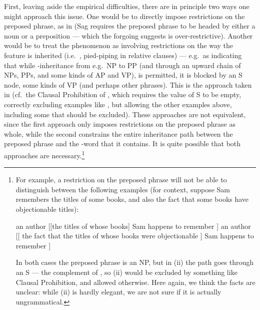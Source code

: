 \documentclass[output=paper
 	        ,biblatex
                ,babelshorthands
                ,newtxmath
                ,draftmode
                ,colorlinks, citecolor=brown
]{langscibook}
\begin{document}
First, leaving aside the empirical difficulties, there are in principle two ways one might
approach this issue. One would be to directly impose restrictions on the preposed phrase,
as in  (Sag requires the preposed phrase to be headed by either a noun
or a preposition --- which the forgoing suggests is over-restrictive). Another would be to
treat the phenomenon as involving restrictions on the way the  feature is
inherited (i.e.\ , pied-piping in relative clauses) --- e.g.\ as
indicating that while -inheritance from e.g.\ NP to PP (and through an upward
chain of NPs, PPs, and some kinds of AP and VP), is permitted, it is blocked by an S node,
some kinds of VP (and perhaps other phrases).  This is the approach taken in  (cf.\
the Clausal  Prohibition of \citealt[220]{Pollard:Sag:94}, which requires the
\feat{rel} value of S to be empty, correctly excluding examples like \pref{x:rc-28}, but
allowing the other examples above, including some that should be excluded). These
approaches are not equivalent, since the first approach only imposes restrictions on the
preposed phrase as whole, while the second constrains the entire inheritance path between
the preposed phrase and the \lic{wh}-word that it contains. It is quite possible that both
approaches are necessary.\footnote{For example, a restriction on the preposed phrase will
  not be able to distinguish between the following examples (for context, suppose Sam
  remembers the titles of some books, and also the fact that some books have objectionable
  titles):
  \begin{exe}
    \ex an author [[the titles of whose books] Sam happens to remember \trace ]
    \ex an author [[ the fact that the titles of whose books were objectionable ]  Sam happens to remember \trace ]
  \end{exe}
  In both cases the preposed phrase is an NP, but in (ii) the \isi{relative
    inheritance} path goes through an S --- the complement of \lic{fact}, so (ii) would be
  excluded by something like Clausal \feat{rel} Prohibition, and allowed otherwise. Here
  again, we think the facts are unclear: while (ii) is hardly elegant, we are not sure if
  it is actually ungrammatical.}
\end{document}
